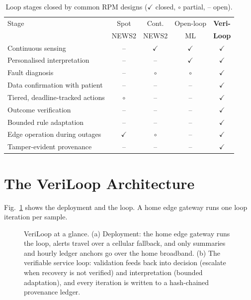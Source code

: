 \documentclass[journal,twoside,web]{IEEEmiot}
\begin{document}
\begin{table}[!t]
\centering
\caption{Loop stages closed by common RPM designs ($\checkmark$ closed, $\circ$ partial, -- open).}
\label{tab:gap}
\footnotesize
\setlength{\tabcolsep}{3pt}
\begin{tabular}{@{}lcccc@{}}
\toprule
Stage & Spot & Cont. & Open-loop & \textbf{Veri-} \\
 & NEWS2 & NEWS2 & ML & \textbf{Loop} \\
\midrule
Continuous sensing & -- & $\checkmark$ & $\checkmark$ & $\checkmark$ \\
Personalised interpretation & -- & -- & $\checkmark$ & $\checkmark$ \\
Fault diagnosis & -- & $\circ$ & $\circ$ & $\checkmark$ \\
Data confirmation with patient & -- & -- & -- & $\checkmark$ \\
Tiered, deadline-tracked actions & $\circ$ & -- & -- & $\checkmark$ \\
Outcome verification & -- & -- & -- & $\checkmark$ \\
Bounded rule adaptation & -- & -- & -- & $\checkmark$ \\
Edge operation during outages & $\checkmark$ & $\circ$ & -- & $\checkmark$ \\
Tamper-evident provenance & -- & -- & -- & $\checkmark$ \\
\bottomrule
\end{tabular}
\end{table}

\section{The VeriLoop Architecture}

Fig.~\ref{fig:arch} shows the deployment and the loop. A home edge gateway runs one loop iteration per sample.

\begin{figure}[t]
\centering
\resizebox{\textwidth}{!}{}
\caption{VeriLoop at a glance. (a) Deployment: the home edge gateway runs the loop, alerts travel over a cellular
fallback, and only summaries and hourly ledger anchors go over the home broadband. (b) The verifiable service loop:
validation feeds back into decision (escalate when recovery is not verified) and interpretation (bounded adaptation),
and every iteration is written to a hash-chained provenance ledger.}
\label{fig:arch}
\end{figure}
\end{document}
